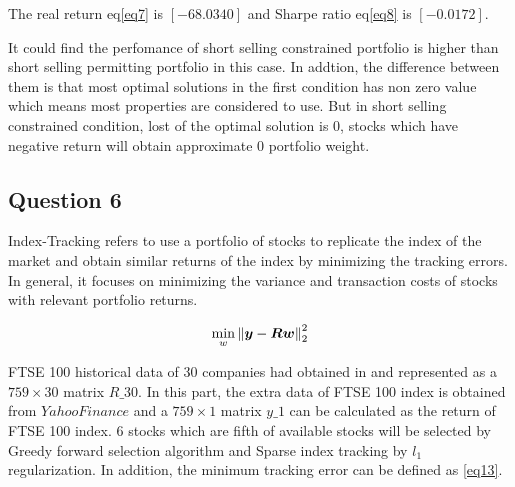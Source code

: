 \documentclass[sigconf]{acmart}
\begin{document}
The real return eq\eqref{eq7} is $[-68.0340]$ and Sharpe ratio eq\eqref{eq8} is $[-0.0172]$. 

It could find the perfomance of short selling constrained portfolio is higher than short selling permitting portfolio in this case. In addtion, the difference between them is that most optimal solutions in the first condition has non zero value which means most properties are considered to use. But in short selling constrained condition, lost of the optimal solution is 0, stocks which have negative return will obtain approximate 0 portfolio weight.



\subsection{Question 6}

Index-Tracking refers to use a portfolio of stocks to replicate the index of the market and obtain similar returns of the index by minimizing the tracking errors. In general, it focuses on minimizing the variance and transaction costs of stocks with relevant portfolio returns.

\begin{equation} \label{eq13}
\setlength{\abovedisplayskip}{3pt}
\setlength{\belowdisplayskip}{3pt}
\min \limits_{w}\left \| \bm{y}-\bm{Rw} \right \|_{2}^{2}
\end{equation}

FTSE 100 historical data of 30 companies had obtained in  and represented as a $759\times30$ matrix $R\_30$. In this part, the extra data of FTSE 100 index is obtained from $YahooFinance$ and a $759\times1$ matrix $y\_1$ can be calculated as the return of FTSE 100 index. 6 stocks which are fifth of available stocks will be selected by Greedy forward selection algorithm and Sparse index tracking by $l_{1}$ regularization. In addition, the minimum tracking error can be defined as \eqref{eq13}.
\end{document}
